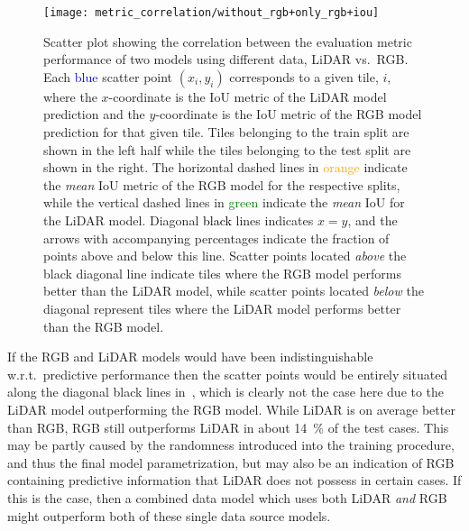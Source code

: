 \begin{figure}[H]
  \centering
  \texttt{[image: metric\_correlation/without\_rgb+only\_rgb+iou]}
  \caption{%
    Scatter plot showing the correlation between the evaluation metric performance of two models using different data, LiDAR vs.\ RGB\@.
    Each \textcolor{blue}{blue} scatter point $(x_i, y_i)$ corresponds to a given tile, $i$, where the $x$-coordinate is the IoU metric of the LiDAR model prediction and the $y$-coordinate is the IoU metric of the RGB model prediction for that given tile.
    Tiles belonging to the train split are shown in the left half while the tiles belonging to the test split are shown in the right.
    The horizontal dashed lines in \textcolor{orange}{orange} indicate the \emph{mean} IoU metric of the RGB model for the respective splits, while the vertical dashed lines in \textcolor{green}{green} indicate the \emph{mean} IoU for the LiDAR model.
    Diagonal \textcolor{black}{black} lines indicates $x = y$, and the arrows with accompanying percentages indicate the fraction of points above and below this line.
    Scatter points located \emph{above} the black diagonal line indicate tiles where the RGB model performs better than the LiDAR model, while scatter points located \emph{below} the diagonal represent tiles where the LiDAR model performs better than the RGB model.
  }%
  \label{fig:rgb-lidar-correlation}\label{fig:correlation-explanation}
\end{figure}

If the RGB and LiDAR models would have been indistinguishable w.r.t.\ predictive performance then the scatter points would be entirely situated along the diagonal black lines in~, which is clearly not the case here due to the LiDAR model outperforming the RGB model.
While LiDAR is on average better than RGB, RGB still outperforms LiDAR in about \SI{14}{\percent} of the test cases.
This may be partly caused by the randomness introduced into the training procedure, and thus the final model parametrization, but may also be an indication of RGB containing predictive information that LiDAR does not possess in certain cases.
If this is the case, then a combined data model which uses both LiDAR \emph{and} RGB might outperform both of these single data source models.

